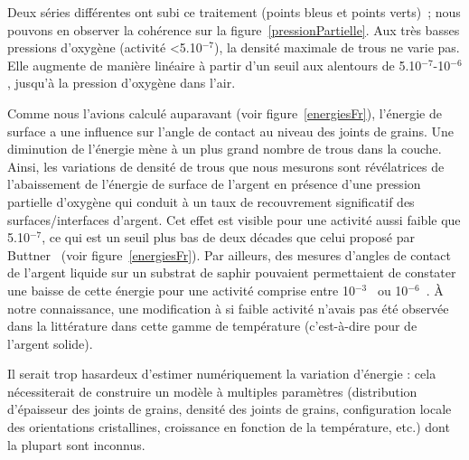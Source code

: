 Deux séries différentes ont subi ce traitement (points bleus et points verts)~; nous pouvons en observer la cohérence sur la figure~\ref{pressionPartielle}. Aux très basses pressions d'oxygène (activité <5.10$^{-7}$), la densité maximale de trous ne varie pas. Elle augmente de manière linéaire à partir d'un seuil aux alentours de 5.10$^{-7}$-10$^{-6}$, jusqu'à la pression d'oxygène dans l'air.\par 
Comme nous l'avions calculé auparavant (voir figure~\ref{energiesFr}), l'énergie de surface a une influence sur l'angle de contact au niveau des joints de grains. Une diminution de l'énergie mène à un plus grand nombre de trous dans la couche. Ainsi, les variations de densité de trous que nous mesurons sont révélatrices de l'abaissement de l'énergie de surface de l'argent en présence d'une pression partielle d'oxygène qui conduit à un taux de recouvrement significatif des surfaces/interfaces d'argent. Cet effet est visible pour une activité aussi faible que 5.10$^{-7}$, ce qui est un seuil plus bas de deux décades que celui proposé par Buttner~\cite{buttner1952adsorption} (voir figure~\ref{energiesFr}). Par ailleurs, des mesures d'angles de contact de l'argent liquide sur un substrat de saphir pouvaient permettaient de constater une baisse de cette énergie pour une activité comprise entre 10$^{-3}$~\cite{chatain94} ou 10$^{-6}$~\cite{muolo08}.  À notre connaissance, une modification à si faible activité n'avais pas été observée dans la littérature dans cette gamme de température (c'est-à-dire pour de l'argent solide).\par 
Il serait trop hasardeux d'estimer numériquement la variation d'énergie : cela nécessiterait de construire un modèle à multiples paramètres (distribution d'épaisseur des joints de grains, densité des joints de grains, configuration locale des orientations cristallines, croissance en fonction de la température, etc.) dont la plupart sont inconnus.\par 
{}
